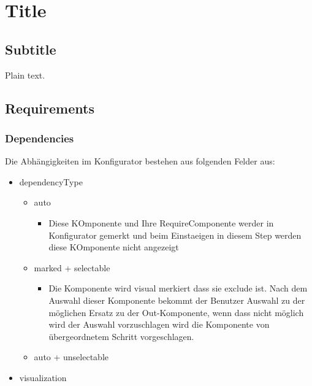 \documentclass{article}
\begin{document}
\section{Title}

\subsection{Subtitle}

Plain text.

\subsection{Requirements}

\subsubsection{Dependencies}

Die Abhängigkeiten im Konfigurator bestehen aus folgenden Felder aus:

\begin{itemize} 
\item dependencyType
\begin{itemize}
  \item auto 
    \begin{itemize}
      \item Diese KOmponente und Ihre RequireComponente werder in Konfigurator
      gemerkt und beim Einstaeigen in diesem Step werden diese KOmponente nicht
      angezeigt
    
    \end{itemize}
  \item marked + selectable
  \begin{itemize}
    \item Die Komponente wird visual merkiert dass sie exclude ist. Nach dem
    Auswahl dieser Komponente bekommt der Benutzer Auswahl zu der möglichen
    Ersatz zu der Out-Komponente, wenn dass nicht möglich wird der Auswahl
    vorzuschlagen wird die Komponente von übergeordnetem Schritt vorgeschlagen.
    
    
  \end{itemize}
  \item auto + unselectable
\end{itemize}
\item visualization

\end{itemize}
\end{document}
